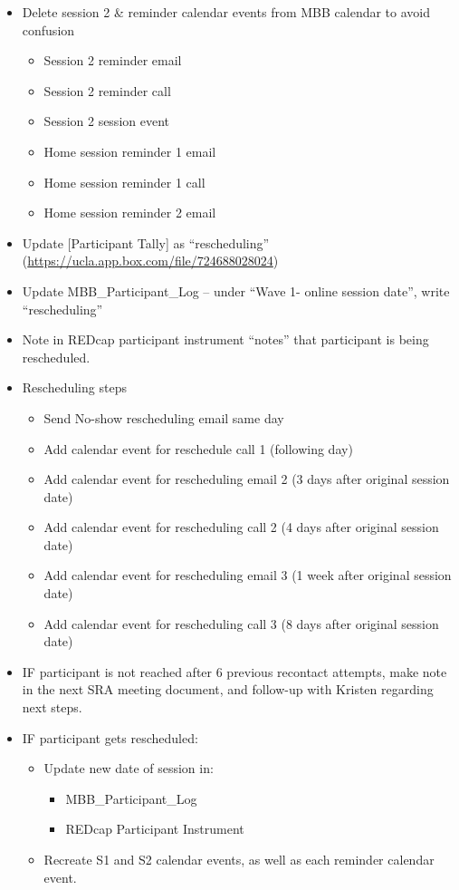 \documentclass[
]{book}
\providecommand{\tightlist}{%
  \setlength{\itemsep}{0pt}\setlength{\parskip}{0pt}}
\begin{document}
\begin{itemize}
\tightlist
\item
  Delete session 2 \& reminder calendar events from MBB calendar to avoid confusion

  \begin{itemize}
  \tightlist
  \item
    Session 2 reminder email
  \item
    Session 2 reminder call
  \item
    Session 2 session event
  \item
    Home session reminder 1 email
  \item
    Home session reminder 1 call
  \item
    Home session reminder 2 email
  \end{itemize}
\item
  Update {[}Participant Tally{]} as ``rescheduling'' (\url{https://ucla.app.box.com/file/724688028024})
\item
  Update MBB\_Participant\_Log -- under ``Wave 1- online session date'', write ``rescheduling''
\item
  Note in REDcap participant instrument ``notes'' that participant is being rescheduled.
\item
  Rescheduling steps

  \begin{itemize}
  \tightlist
  \item
    Send No-show rescheduling email same day
  \item
    Add calendar event for reschedule call 1 (following day)
  \item
    Add calendar event for rescheduling email 2 (3 days after original session date)
  \item
    Add calendar event for rescheduling call 2 (4 days after original session date)
  \item
    Add calendar event for rescheduling email 3 (1 week after original session date)
  \item
    Add calendar event for rescheduling call 3 (8 days after original session date)
  \end{itemize}
\item
  IF participant is not reached after 6 previous recontact attempts, make note in the next SRA meeting document, and follow-up with Kristen regarding next steps.
\item
  IF participant gets rescheduled:

  \begin{itemize}
  \tightlist
  \item
    Update new date of session in:

    \begin{itemize}
    \tightlist
    \item
      MBB\_Participant\_Log
    \item
      REDcap Participant Instrument
    \end{itemize}
  \item
    Recreate S1 and S2 calendar events, as well as each reminder calendar event.
  \end{itemize}
\end{itemize}
\end{document}
